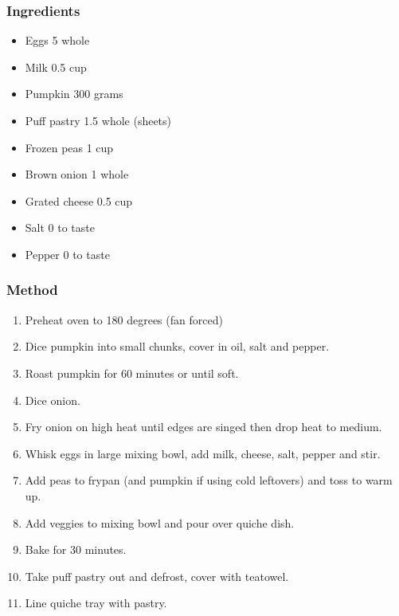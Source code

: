\documentclass[]{article}
\begin{document}
\subsubsection*{\Large Ingredients}
\begin{multicols}{2}
\begin{itemize}
 \item Eggs \hfill 5 whole
 \item Milk \hfill 0.5 cup
 \item Pumpkin \hfill 300 grams
 \item Puff pastry \hfill 1.5 whole (sheets)
 \item Frozen peas \hfill 1 cup
 \item Brown onion \hfill 1 whole
 \item Grated cheese \hfill 0.5 cup
 \item Salt \hfill 0 to taste
 \item Pepper \hfill 0 to taste
\end{itemize}
\end{multicols}
\subsubsection*{\Large Method}
\begin{enumerate}[font=\huge\color{accent}]
	\item Preheat oven to 180 degrees (fan forced)
	\item Dice pumpkin into small chunks, cover in oil, salt and pepper.
	\item Roast pumpkin for 60 minutes or until soft.
	\item Dice onion.
	\item Fry onion on high heat until edges are singed then drop heat to medium.
	\item Whisk eggs in large mixing bowl, add milk, cheese, salt, pepper and stir.
	\item Add peas to frypan (and pumpkin if using cold leftovers) and toss to warm up.
	\item Add veggies to mixing bowl and pour over quiche dish.
	\item Bake for 30 minutes.
	\item Take puff pastry out and defrost, cover with teatowel.
	\item Line quiche tray with pastry.
\end{enumerate}
\newpage
{}\label{rec:Tarte Dijonnaise}
\end{document}
